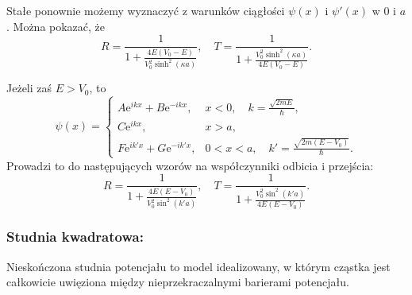 Stałe ponownie możemy wyznaczyć z warunków ciągłości $\psi(x)$ i $\psi'(x)$ w $0$ i $a$. Można pokazać, że
\begin{equation*}
	R = \frac{1}{1 + \frac{4E(V_0 - E)}{V_0^2 \sinh^2(\kappa a)}}, \quad T = \frac{1}{1 + \frac{V_0^2 \sinh^2(\kappa a)}{4E(V_0 - E)}}.
\end{equation*}

Jeżeli zaś $E>V_0$, to
\begin{equation*}
	\psi(x) = \begin{cases}
		A\mathrm{e}^{ikx} + B\mathrm{e}^{-ikx}, &x<0, \quad k = \frac{\sqrt{2mE}}{\hbar},\\
		C\mathrm{e}^{ikx}, & x>a,\\
		F\mathrm{e}^{ik'x} + G\mathrm{e}^{-ik'x}, &0<x<a, \quad k' = \frac{\sqrt{2m(E-V_0)}}{\hbar}.
	\end{cases}
\end{equation*}
Prowadzi to do następujących wzorów na współczynniki odbicia i przejścia:
\begin{equation*}
		R = \frac{1}{1 + \frac{4E(E-V_0)}{V_0^2 \sin^2(k'a)}}, \quad T = \frac{1}{1 + \frac{V_0^2 \sin^2(k' a)}{4E(E-V_0)}}.
\end{equation*}

\subsubsection*{Studnia kwadratowa:}
Nieskończona studnia potencjału to model idealizowany, w którym cząstka jest całkowicie
uwięziona między nieprzekraczalnymi barierami potencjału.

